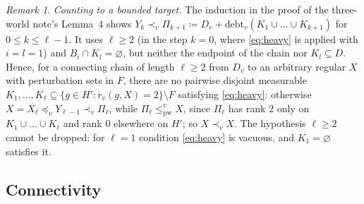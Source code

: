 \documentclass[11pt]{article}
\theoremstyle{definition}\newtheorem{definition}[theorem]{Definition}
\theoremstyle{remark}\newtheorem{remark}[theorem]{Remark}
\newcommand{\debt}{\mathrm{debt}}
\newcommand{\pw}{\mathrm{pw}}
\begin{document}
\begin{remark}\label{rem:bounded}
\emph{Counting to a bounded target.} The induction in the proof of the
three-world note's Lemma~4 shows $Y_k\prec_v\Pi_{k+1}\coloneqq
D_v+\debt_v(K_1\cup\dots\cup K_{k+1})$ for $0\le k\le\ell-1$. It uses
$\ell\ge2$ (in the step $k=0$, where \eqref{eq:heavy} is applied with
$i=l=1$) and $B_i\cap K_l=\varnothing$, but neither the endpoint of the
chain nor $K_l\subseteq D$. Hence, for a connecting chain of length
$\ell\ge2$ from $D_v$ to an arbitrary regular $X$ with perturbation sets in
$F$, there are no pairwise disjoint measurable
$K_1,\dots,K_\ell\subseteq\{g\in H':r_v(g,X)=2\}\setminus F$ satisfying
\eqref{eq:heavy}: otherwise $X=X_\ell\preceq_vY_{\ell-1}\prec_v\Pi_\ell$,
while $\Pi_\ell\le^v_\pw X$, since $\Pi_\ell$ has rank $2$ only on
$K_1\cup\dots\cup K_\ell$ and rank $0$ elsewhere on $H'$; so
$X\prec_vX$. The hypothesis $\ell\ge2$ cannot be dropped: for $\ell=1$
condition \eqref{eq:heavy} is vacuous, and $K_1=\varnothing$ satisfies it.
\end{remark}

\subsection{Connectivity}\label{sec:cut}
\end{document}
